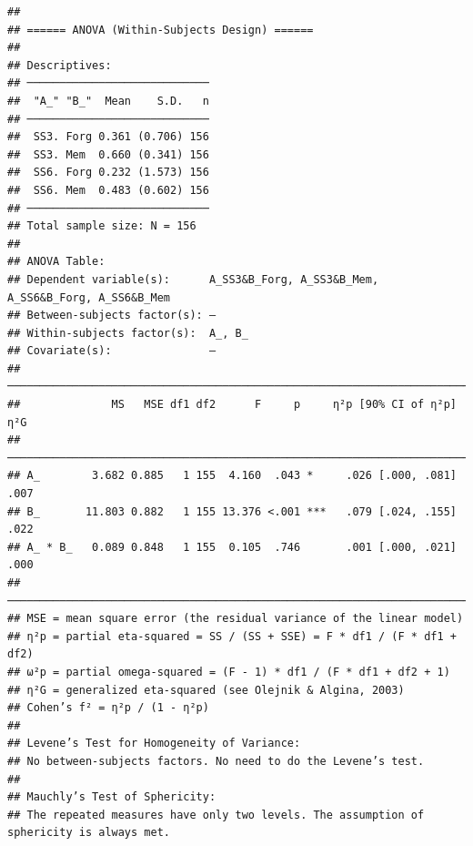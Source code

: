 \documentclass[
  man]{apa6}
\begin{document}
\begin{verbatim}
## 
## ====== ANOVA (Within-Subjects Design) ======
## 
## Descriptives:
## ────────────────────────────
##  "A_" "B_"  Mean    S.D.   n
## ────────────────────────────
##  SS3. Forg 0.361 (0.706) 156
##  SS3. Mem  0.660 (0.341) 156
##  SS6. Forg 0.232 (1.573) 156
##  SS6. Mem  0.483 (0.602) 156
## ────────────────────────────
## Total sample size: N = 156
## 
## ANOVA Table:
## Dependent variable(s):      A_SS3&B_Forg, A_SS3&B_Mem, A_SS6&B_Forg, A_SS6&B_Mem
## Between-subjects factor(s): –
## Within-subjects factor(s):  A_, B_
## Covariate(s):               –
## ───────────────────────────────────────────────────────────────────────
##              MS   MSE df1 df2      F     p     η²p [90% CI of η²p]  η²G
## ───────────────────────────────────────────────────────────────────────
## A_        3.682 0.885   1 155  4.160  .043 *     .026 [.000, .081] .007
## B_       11.803 0.882   1 155 13.376 <.001 ***   .079 [.024, .155] .022
## A_ * B_   0.089 0.848   1 155  0.105  .746       .001 [.000, .021] .000
## ───────────────────────────────────────────────────────────────────────
## MSE = mean square error (the residual variance of the linear model)
## η²p = partial eta-squared = SS / (SS + SSE) = F * df1 / (F * df1 + df2)
## ω²p = partial omega-squared = (F - 1) * df1 / (F * df1 + df2 + 1)
## η²G = generalized eta-squared (see Olejnik & Algina, 2003)
## Cohen’s f² = η²p / (1 - η²p)
## 
## Levene’s Test for Homogeneity of Variance:
## No between-subjects factors. No need to do the Levene’s test.
## 
## Mauchly’s Test of Sphericity:
## The repeated measures have only two levels. The assumption of sphericity is always met.
\end{verbatim}
\end{document}
